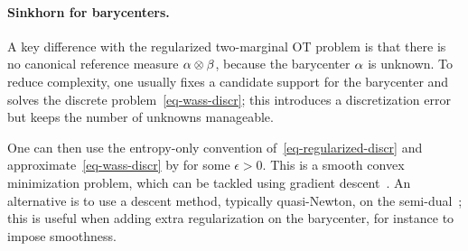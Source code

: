 \paragraph{Sinkhorn for barycenters.}

A key difference with the regularized two-marginal OT problem is that there is no canonical reference measure $\alpha\otimes\beta$, because the barycenter $\alpha$ is unknown. To reduce complexity, one usually fixes a candidate support for the barycenter and solves the discrete problem~\eqref{eq-wass-discr}; this introduces a discretization error but keeps the number of unknowns manageable.

One can then use the entropy-only convention of~\eqref{eq-regularized-discr} and approximate~\eqref{eq-wass-discr} by
for some $\epsilon>0$. This is a smooth convex minimization problem, which can be tackled using gradient descent~\cite{CuturiBarycenter}. An alternative is to use a descent method, typically quasi-Newton, on the semi-dual~\cite{2016-Cuturi-siims}; this is useful when adding extra regularization on the barycenter, for instance to impose smoothness.

